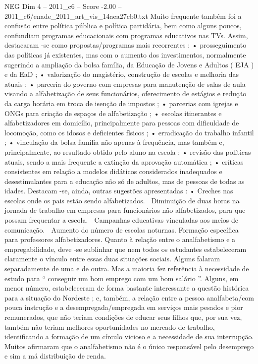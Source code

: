 \begin{textsample}{NEG Dim 4 – 2011\_c6 – Score -2.00 – 2011\_c6/enade\_2011\_art\_vis\_14aea27cb0.txt}
Muito frequente também foi a confusão entre política pública e política partidária, bem como alguns poucos, confundiam programas educacionais com programas educativos nas TVs.
Assim, destacaram -se como propostas/programas mais recorrentes : • prosseguimento das políticas já existentes, mas com o aumento dos investimentos, normalmente sugerindo a ampliação da bolsa família, da Educação de Jovens e Adultos ( EJA ) e da EaD ; • valorização do magistério, construção de escolas e melhoria das atuais ; • parceria do governo com empresas para manutenção de salas de aula visando a alfabetização de seus funcionários, oferecimento de estágios e redução da carga horária em troca de isenção de impostos ; • parcerias com igrejas e ONGs para criação de espaços de alfabetização ; • escolas itinerantes e alfabetizadores em domicílio, principalmente para pessoas com dificuldade de locomoção, como os idosos e deficientes físicos ; • erradicação do trabalho infantil ; • vinculação da bolsa família não apenas à frequência, mas também e, principalmente, ao resultado obtido pelo aluno na escola ; • revisão das políticas atuais, sendo a mais frequente a extinção da aprovação automática ; • críticas consistentes em relação a modelos didáticos considerados inadequados e desestimulantes para a educação não só de adultos, mas de pessoas de todas as idades.
Destacam -se, ainda, outras sugestões apresentadas : • Creches nas escolas onde os pais estão sendo alfabetizados.  Diminuição de duas horas na jornada de trabalho em empresas para funcionários não alfabetizados, para que possam frequentar a escola.  Campanhas educativas vinculadas aos meios de comunicação.  Aumento do número de escolas noturnas.
Formação específica para professores alfabetizadores.
Quanto à relação entre o analfabetismo e a empregabilidade, deve -se sublinhar que nem todos os estudantes estabeleceram claramente o vínculo entre essas duas situações sociais.
Alguns falaram separadamente de uma e de outra.
Mas a maioria fez referência à necessidade de estudo para “ conseguir um bom emprego com um bom salário ”.
Alguns, em menor número, estabeleceram de forma bastante interessante a questão histórica para a situação do Nordeste ; e, também, a relação entre a pessoa analfabeta/com pouca instrução e a desempregada/empregada em serviços mais pesados e pior remunerados, que não teriam condições de educar seus filhos que, por sua vez, também não teriam melhores oportunidades no mercado de trabalho, identificando a formação de um círculo vicioso e a necessidade de sua interrupção.
Muitos afirmaram que o analfabetismo não é o único responsável pelo desemprego e sim a má distribuição de renda.

\end{textsample}
